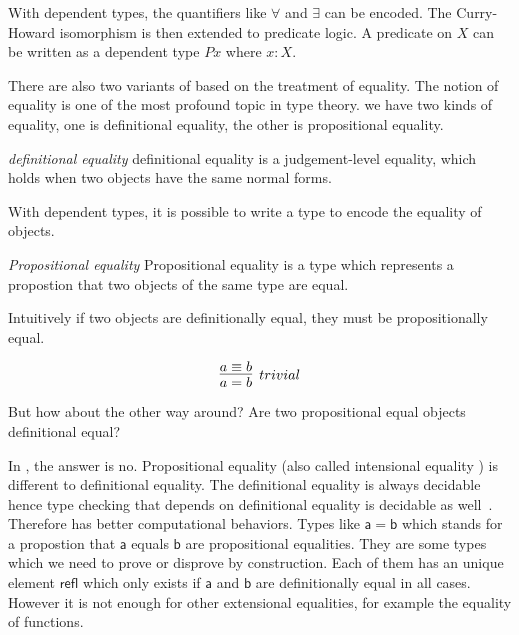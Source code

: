 With dependent types, the quantifiers like $\forall$ and $\exists$ can be encoded.
The Curry-Howard isomorphism is then extended to predicate logic. 
A predicate on $X$ can be written as a dependent type $P x$ where $x : X$. 

There are also two variants of \mltt based on the treatment of equality.
The notion of equality is one of the most profound topic in type theory.
we have two kinds of equality, one is definitional equality, the other is propositional equality.

\begin{definition}
\textit{definitional equality} definitional equality is a judgement-level equality, which holds when two objects have the same normal forms\cite{nor}.
\end{definition}



With dependent types, it is possible to write a type to encode the equality of objects.

\begin{definition}
\textit{Propositional equality} Propositional equality is a type which represents a propostion that two objects of the same type are equal.
\end{definition}

Intuitively if two objects are definitionally equal, they must be propositionally equal.

\begin{equation*}
\infer[trivial]{a = b}{a \equiv b}
\end{equation*}

But how about the other way around? Are two propositional equal objects definitional equal?


In \itt, the answer is no. Propositional equality (also called intensional equality  \cite{nor:90}) is different to definitional equality. 
The definitional equality is always decidable hence type checking that depends on definitional equality is
decidable as well~\cite{alt:99}. Therefore \itt has better computational behaviors.
Types like $\mathsf{a = b}$ which stands for a
propostion that $\mathsf{a}$ equals $\mathsf{b}$ are propositional equalities. They are some types which we need to prove
or disprove by construction. Each of them has an unique element $\mathsf{refl}$ which only exists if $\mathsf{a}$ and $\mathsf{b}$ are
definitionally equal in all cases. However it is not enough for other extensional equalities, for example the equality of functions.





